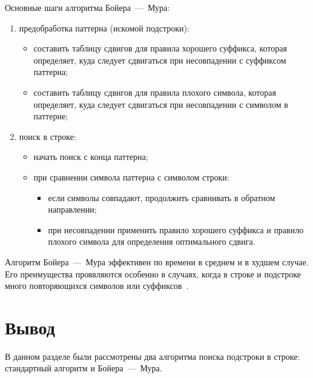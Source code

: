 Основные шаги алгоритма Бойера~---~Мура:
\begin{enumerate}
	\item предобработка паттерна (искомой подстроки):
	\begin{itemize}
		\item составить таблицу сдвигов для правила хорошего суффикса, которая определяет, куда следует сдвигаться при несовпадении с суффиксом паттерна;
		\item составить таблицу сдвигов для правила плохого символа, которая определяет, куда следует сдвигаться при несовпадении с символом в паттерне;
	\end{itemize}
	\item поиск в строке:
	\begin{itemize}
		\item начать поиск с конца паттерна;
		\item при сравнении символа паттерна с символом строки:
		\begin{itemize}
			\item если символы совпадают, продолжить сравнивать в обратном направлении;
			\item при несовпадении применить правило хорошего суффикса и правило плохого символа для определения оптимального сдвига.
		\end{itemize}
	\end{itemize}
\end{enumerate}

Алгоритм Бойера~---~Мура эффективен по времени в среднем и в худшем случае. 
Его преимущества проявляются особенно в случаях, когда в строке и подстроке много повторяющихся символов или суффиксов~\cite{intro}.

\section*{Вывод}

В данном разделе были рассмотрены два алгоритма поиска подстроки в строке: стандартный алгоритм и Бойера~---~Мура.
